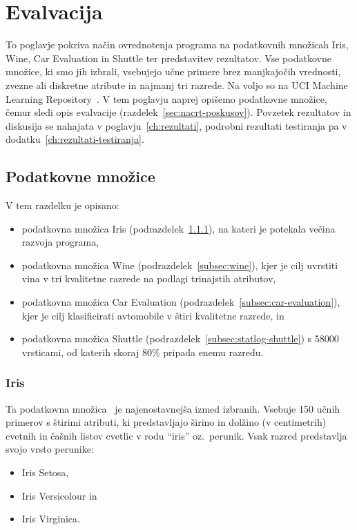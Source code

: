 \documentclass[a4paper,12pt,openright]{book}
\begin{document}
    \chapter{Evalvacija}\label{ch:evalvacija}
    To poglavje pokriva način ovrednotenja programa na podatkovnih množicah Iris, Wine, Car Evaluation in Shuttle ter predstavitev rezultatov.
    Vse podatkovne množice, ki smo jih izbrali, vsebujejo učne primere brez manjkajočih vrednosti, zvezne ali diskretne atribute in najmanj tri razrede.
    Na voljo so na UCI Machine Learning Repository~\cite{Dua:2019}.
    V tem poglavju naprej opišemo podatkovne množice, čemur sledi opis evalvacije (razdelek~\ref{sec:nacrt-poskusov}).
    Povzetek rezultatov in diskusija se nahajata v poglavju~\ref{ch:rezultati}, podrobni rezultati testiranja pa v dodatku~\ref{ch:rezultati-testiranja}.

    \section{Podatkovne množice}\label{sec:podatkovne-mnozice}
    V tem razdelku je opisano:
    \begin{itemize}
        \item podatkovna množica Iris (podrazdelek~\ref{subsec:iris}), na kateri je potekala večina razvoja programa,
        \item podatkovna množica Wine (podrazdelek~\ref{subsec:wine}), kjer je cilj uvrstiti vina v tri kvalitetne razrede na podlagi trinajstih atributov,
        \item podatkovna množica Car Evaluation (podrazdelek~\ref{subsec:car-evaluation}), kjer je cilj klasificirati avtomobile v štiri kvalitetne razrede, in
        \item podatkovna množica Shuttle (podrazdelek~\ref{subsec:statlog-shuttle}) s 58000 vrsticami, od katerih skoraj 80\% pripada enemu razredu.
    \end{itemize}

    \subsection{Iris}\label{subsec:iris}
    Ta podatkovna množica~\cite{misc_iris_53} je najenostavnejša izmed izbranih.
    Vsebuje 150 učnih primerov s štirimi atributi, ki predstavljajo širino in dolžino (v centimetrih) cvetnih in čašnih
    listov cvetlic v rodu \enquote{iris} oz.\ perunik.
    Vsak razred predstavlja svojo vrsto perunike:
    \begin{itemize}
        \item Iris Setosa,
        \item Iris Versicolour in
        \item Iris Virginica.
    \end{itemize}
\end{document}
